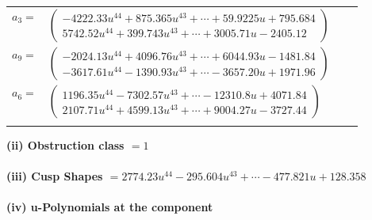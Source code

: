 \documentclass[1p]{elsarticle_modified}
\theoremstyle{definition}
\begin{document}
\begin{tabular}{m{7pt} m{180pt} m{7pt} m{180pt} }
\flushright $a_{3}=$&$\begin{pmatrix}-4222.33 u^{44}+875.365 u^{43}+\cdots+59.9225 u+795.684\\5742.52 u^{44}+399.743 u^{43}+\cdots+3005.71 u-2405.12\end{pmatrix}$ \\
\flushright $a_{9}=$&$\begin{pmatrix}-2024.13 u^{44}+4096.76 u^{43}+\cdots+6044.93 u-1481.84\\-3617.61 u^{44}-1390.93 u^{43}+\cdots-3657.20 u+1971.96\end{pmatrix}$ \\
\flushright $a_{6}=$&$\begin{pmatrix}1196.35 u^{44}-7302.57 u^{43}+\cdots-12310.8 u+4071.84\\2107.71 u^{44}+4599.13 u^{43}+\cdots+9004.27 u-3727.44\end{pmatrix}$\\&\end{tabular}
\flushleft \textbf{(ii) Obstruction class $= 1$}\\~\\
\flushleft \textbf{(iii) Cusp Shapes $= 2774.23 u^{44}-295.604 u^{43}+\cdots-477.821 u+128.358$}\\~\\
\newpage\renewcommand{\arraystretch}{1}
\flushleft \textbf{(iv) u-Polynomials at the component}\newline \\
\end{document}
